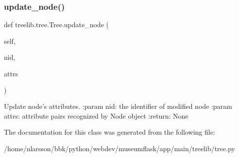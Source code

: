 \subsubsection{\texorpdfstring{update\+\_\+node()}{update\_node()}}
{\footnotesize\ttfamily def treelib.\+tree.\+Tree.\+update\+\_\+node (\begin{DoxyParamCaption}\item[{}]{self,  }\item[{}]{nid,  }\item[{}]{attrs }\end{DoxyParamCaption})}

\begin{DoxyVerb}Update node's attributes.
:param nid: the identifier of modified node
:param attrs: attribute pairs recognized by Node object
:return: None
\end{DoxyVerb}
 

The documentation for this class was generated from the following file\+:\begin{DoxyCompactItemize}
\item 
/home/nlarsson/bbk/python/webdev/museumflask/app/main/treelib/tree.\+py\end{DoxyCompactItemize}
